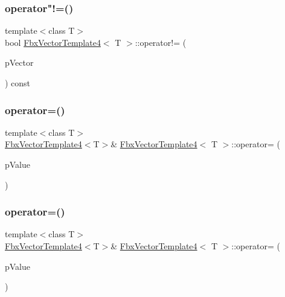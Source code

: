 \mbox{\label{class_fbx_vector_template4_aedbfa88c1a1e2870319ab4f2d775a40d}} 
\subsubsection{\texorpdfstring{operator"!=()}{operator!=()}}
{\footnotesize\ttfamily template$<$class T$>$ \\
bool \hyperlink{class_fbx_vector_template4}{Fbx\+Vector\+Template4}$<$ T $>$\+::operator!= (\begin{DoxyParamCaption}\item[{const \hyperlink{class_fbx_vector_template4}{Fbx\+Vector\+Template4}$<$ T $>$ \&}]{p\+Vector }\end{DoxyParamCaption}) const}

\mbox{\label{class_fbx_vector_template4_a4cfd0c8e3412fff0ebd0b8f40865240e}} 
\subsubsection{\texorpdfstring{operator=()}{operator=()}\hspace{0.1cm}{\footnotesize\ttfamily [1/3]}}
{\footnotesize\ttfamily template$<$class T$>$ \\
\hyperlink{class_fbx_vector_template4}{Fbx\+Vector\+Template4}$<$T$>$\& \hyperlink{class_fbx_vector_template4}{Fbx\+Vector\+Template4}$<$ T $>$\+::operator= (\begin{DoxyParamCaption}\item[{const T \&}]{p\+Value }\end{DoxyParamCaption})}

\mbox{\label{class_fbx_vector_template4_aed4c70484a78794cf73ca8b0965f395c}} 
\subsubsection{\texorpdfstring{operator=()}{operator=()}\hspace{0.1cm}{\footnotesize\ttfamily [2/3]}}
{\footnotesize\ttfamily template$<$class T$>$ \\
\hyperlink{class_fbx_vector_template4}{Fbx\+Vector\+Template4}$<$T$>$\& \hyperlink{class_fbx_vector_template4}{Fbx\+Vector\+Template4}$<$ T $>$\+::operator= (\begin{DoxyParamCaption}\item[{const \hyperlink{class_fbx_vector_template3}{Fbx\+Vector\+Template3}$<$ T $>$ \&}]{p\+Value }\end{DoxyParamCaption})}

